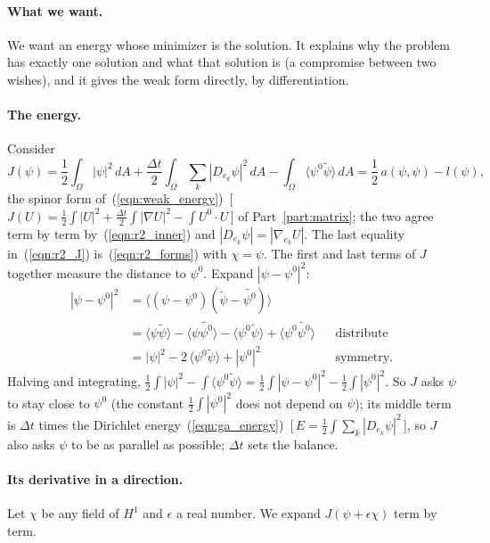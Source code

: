 \paragraph{What we want.} We want an energy whose minimizer is the solution. It explains why the problem has exactly one solution and what that solution is (a compromise between two wishes), and it gives the weak form directly, by differentiation.

\paragraph{The energy.} Consider
\begin{equation}
\label{eqn:r2_J}
J(\psi) = \frac12 \int_\Omega |\psi|^2\, dA + \frac{\Delta t}{2} \int_\Omega \sum_k |D_{e_k}\psi|^2\, dA - \int_\Omega \langle\psi^0\widetilde\psi\rangle\, dA = \frac12\, a(\psi, \psi) - l(\psi) ,
\end{equation}
the spinor form of~(\ref{eqn:weak_energy})~[\,$J(U) = \frac12\int|U|^2 + \frac{\Delta t}2\int|\nabla U|^2 - \int U^0\cdot U$\,] of Part~\ref{part:matrix}; the two agree term by term by~(\ref{eqn:r2_inner}) and $|D_{e_k}\psi| = |\nabla_{e_k}U|$. The last equality in~(\ref{eqn:r2_J}) is~(\ref{eqn:r2_forms}) with $\chi = \psi$. The first and last terms of $J$ together measure the distance to $\psi^0$. Expand $|\psi - \psi^0|^2$:
\begin{align*}
|\psi - \psi^0|^2 &= \big\langle (\psi - \psi^0)(\widetilde\psi - \widetilde{\psi^0})\big\rangle \\
&= \langle\psi\widetilde\psi\rangle - \langle\psi\widetilde{\psi^0}\rangle - \langle\psi^0\widetilde\psi\rangle + \langle\psi^0\widetilde{\psi^0}\rangle && \text{distribute} \\
&= |\psi|^2 - 2\,\langle\psi^0\widetilde\psi\rangle + |\psi^0|^2 && \text{symmetry.}
\end{align*}
Halving and integrating, $\frac12\int|\psi|^2 - \int\langle\psi^0\widetilde\psi\rangle = \frac12\int|\psi - \psi^0|^2 - \frac12\int|\psi^0|^2$. So $J$ asks $\psi$ to stay close to $\psi^0$ (the constant $\frac12\int|\psi^0|^2$ does not depend on $\psi$); its middle term is $\Delta t$ times the Dirichlet energy~(\ref{eqn:ga_energy})~[\,$E = \frac12\int\sum_k|D_{e_k}\psi|^2$\,], so $J$ also asks $\psi$ to be as parallel as possible; $\Delta t$ sets the balance.

\paragraph{Its derivative in a direction.} Let $\chi$ be any field of $H^1$ and $\epsilon$ a real number. We expand $J(\psi + \epsilon\chi)$ term by term.

